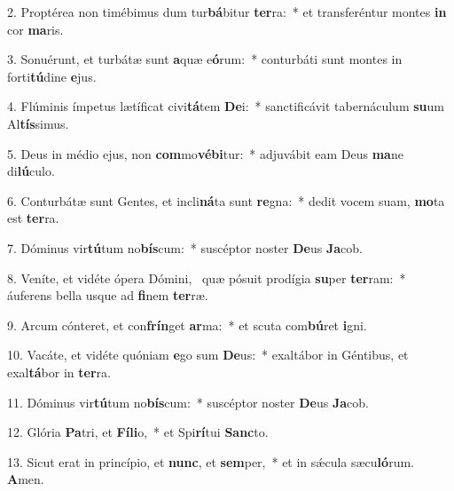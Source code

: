 2. Proptérea non timébimus dum tur\textbf{bá}bitur \textbf{ter}ra:~*  et transferéntur montes \textbf{in} cor \textbf{ma}ris.\

3. Sonuérunt, et turbátæ sunt \textbf{a}quæ e\textbf{ó}rum:~*  conturbáti sunt montes in forti\textbf{tú}dine \textbf{e}jus.\

4. Flúminis ímpetus lætíficat civi\textbf{tá}tem \textbf{De}i:~*  sanctificávit tabernáculum \textbf{su}um Al\textbf{tís}simus.\

5. Deus in médio ejus, non \textbf{com}mo\textbf{vé}\textbf{bi}tur:~*  adjuvábit eam Deus \textbf{ma}ne di\textbf{lú}culo.\

6. Conturbátæ sunt Gentes, et incli\textbf{ná}ta sunt \textbf{re}gna:~*  dedit vocem suam, \textbf{mo}ta est \textbf{ter}ra.\

7. Dóminus vir\textbf{tú}tum no\textbf{bís}cum:~*  suscéptor noster \textbf{De}us \textbf{Ja}cob.\

8. Veníte, et vidéte ópera Dómini, \dag\  quæ pósuit prodígia \textbf{su}per \textbf{ter}ram:~*  áuferens bella usque ad \textbf{fi}nem \textbf{ter}ræ.\

9. Arcum cónteret, et con\textbf{frín}get \textbf{ar}ma:~*  et scuta com\textbf{bú}ret \textbf{i}gni.\

10. Vacáte, et vidéte quóniam \textbf{e}go sum \textbf{De}us:~*  exaltábor in Géntibus, et exal\textbf{tá}bor in \textbf{ter}ra.\

11. Dóminus vir\textbf{tú}tum no\textbf{bís}cum:~*  suscéptor noster \textbf{De}us \textbf{Ja}cob.\

12. Glória \textbf{Pa}tri, et \textbf{Fí}\textbf{li}o,~*  et Spi\textbf{rí}tui \textbf{Sanc}to.\

13. Sicut erat in princípio, et \textbf{nunc}, et \textbf{sem}per,~*  et in sǽcula sæcu\textbf{ló}rum. \textbf{A}men.\

